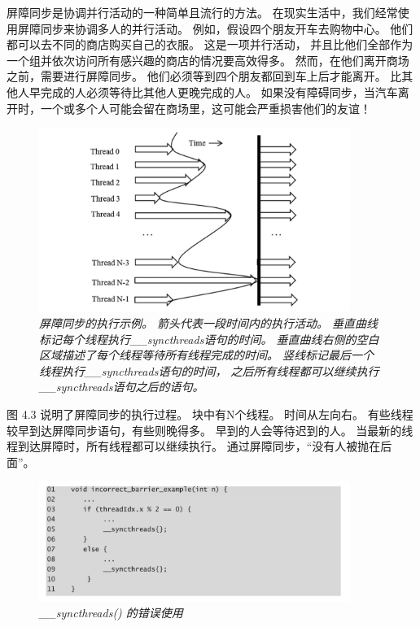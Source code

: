 屏障同步是协调并行活动的一种简单且流行的方法。 在现实生活中，我们经常使用屏障同步来协调多人的并行活动。 
例如，假设四个朋友开车去购物中心。 他们都可以去不同的商店购买自己的衣服。 这是一项并行活动，
并且比他们全部作为一个组并依次访问所有感兴趣的商店的情况要高效得多。 然而，在他们离开商场之前，需要进行屏障同步。 
他们必须等到四个朋友都回到车上后才能离开。 比其他人早完成的人必须等待比其他人更晚完成的人。 
如果没有障碍同步，当汽车离开时，一个或多个人可能会留在商场里，这可能会严重损害他们的友谊！

\begin{figure}[H]
	\centering
	\includegraphics[width=0.9\textwidth]{figs/F4.3.png}
	\caption{\textit{屏障同步的执行示例。 箭头代表一段时间内的执行活动。 
	垂直曲线标记每个线程执行\_\_syncthreads语句的时间。 
	垂直曲线右侧的空白区域描述了每个线程等待所有线程完成的时间。 
	竖线标记最后一个线程执行\_\_syncthreads语句的时间，
	之后所有线程都可以继续执行\_\_syncthreads语句之后的语句。}}
\end{figure}

图 4.3 说明了屏障同步的执行过程。 块中有N个线程。 时间从左向右。 有些线程较早到达屏障同步语句，有些则晚得多。 
早到的人会等待迟到的人。 当最新的线程到达屏障时，所有线程都可以继续执行。 通过屏障同步，“没有人被抛在后面”。

\begin{figure}[H]
	\centering
	\includegraphics[width=0.9\textwidth]{figs/F4.4.png}
	\caption{\textit{\_\_syncthreads() 的错误使用}}
\end{figure}

